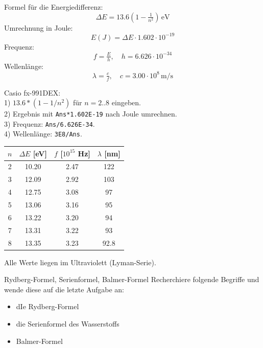 \documentclass[11pt,a4paper,oneside]{article}
\begin{document}
	\begin{loesung}{}
		Formel für die Energiedifferenz:
		\[
		\Delta E = 13.6\left(1 - \tfrac{1}{n^2}\right)\,\text{eV}
		\]
		Umrechnung in Joule:
		\[
		E(J) = \Delta E \cdot 1.602 \cdot 10^{-19}
		\]
		Frequenz:
		\[
		f = \tfrac{E}{h}, \quad h = 6.626 \cdot 10^{-34}
		\]
		Wellenlänge:
		\[
		\lambda = \tfrac{c}{f}, \quad c = 3.00 \cdot 10^{8}\,\text{m/s}
		\]
		
		\noindent Casio fx-991DEX: \\
		1) \texttt{$13.6*(1-1/{n}^2)$} für $n=2..8$ eingeben. \\
		2) Ergebnis mit \texttt{Ans*1.602E-19} nach Joule umrechnen. \\
		3) Frequenz: \texttt{Ans/6.626E-34}. \\
		4) Wellenlänge: \texttt{3E8/Ans}. \\
		
		\begin{center}
			\begin{tabular}{|c|c|c|c|}
				\hline
				$n$ & $\Delta E$ [eV] & $f$ [$10^{15}$ Hz] & $\lambda$ [nm] \\
				\hline
				2 & 10.20 & 2.47 & 122 \\
				3 & 12.09 & 2.92 & 103 \\
				4 & 12.75 & 3.08 & 97 \\
				5 & 13.06 & 3.16 & 95 \\
				6 & 13.22 & 3.20 & 94 \\
				7 & 13.31 & 3.22 & 93 \\
				8 & 13.35 & 3.23 & 92.8 \\
				\hline
			\end{tabular}
		\end{center}
		
		Alle Werte liegen im Ultraviolett (Lyman-Serie).
	\end{loesung}
	
	
	\begin{aufgabe}{Rydberg-Formel, Serienformel, Balmer-Formel}
		Recherchiere folgende Begriffe und wende diese auf die letzte Aufgabe an:
		\begin{itemize}
			\item dIe Rydberg-Formel
			\item die Serienformel des Wasserstoffs
			\item Balmer-Formel 
		\end{itemize}
	\end{aufgabe}
	
	\newpage
	
\end{document}
